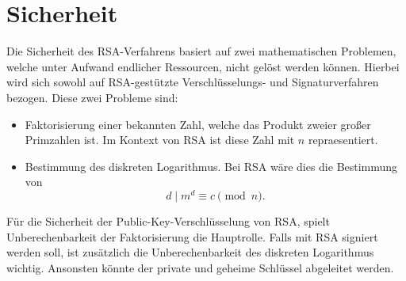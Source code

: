 \section{Sicherheit}
Die Sicherheit des RSA-Verfahrens basiert auf zwei mathematischen Problemen, welche unter Aufwand endlicher Ressourcen, nicht gelöst werden können. Hierbei wird sich sowohl auf RSA-gestützte Verschlüsselungs- und Signaturverfahren bezogen.
Diese zwei Probleme sind:
\begin{itemize}
    \item Faktorisierung einer bekannten Zahl, welche das Produkt zweier großer Primzahlen ist. Im Kontext von RSA ist diese Zahl mit $n$ repraesentiert.
    \item Bestimmung des diskreten Logarithmus. Bei RSA wäre dies die Bestimmung von 
    \begin{equation}
        d \mid m^{d} \equiv c \pmod n .
    \end{equation}
\end{itemize}

Für die Sicherheit der Public-Key-Verschlüsselung von RSA, spielt Unberechenbarkeit der Faktorisierung die Hauptrolle. Falls mit RSA signiert werden soll, ist zusätzlich die Unberechenbarkeit des diskreten Logarithmus wichtig. Ansonsten könnte der private und geheime Schlüssel abgeleitet werden.



